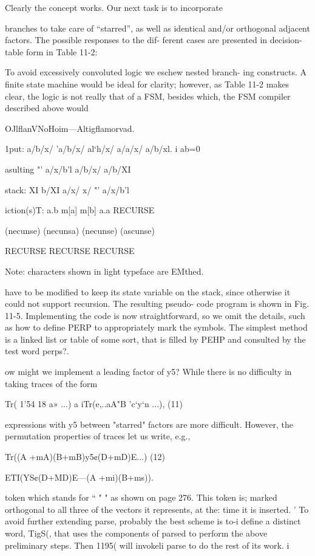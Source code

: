 Clearly the concept works. Our next task is to incorporate

branches to take care of “starred”, as well as identical and/or
orthogonal adjacent factors. The possible responses to the dif-
ferent cases are presented in decision-table form in Table 11-2:

To avoid excessively convoluted logic we eschew nested branch-
ing constructs. A finite state machine would be ideal for clarity;
however, as Table 11-2 makes clear, the logic is not really that of
a FSM, besides which, the FSM compiler described above would

OJlﬂanVNoHoim—Altigﬂamorvad.

 

 

1put: a/b/x/ 'a/b/x/ al‘h/x/ a/a/x/ a/b/xl. i
ab=0

asulting "' a/x/b'l a/b/x/ a/b/XI

stack: XI b/XI a/x/ x/ "' a/x/b’l

iction(s)T: a.b m[a] m[b] a.a RECURSE

 

(necunse) (necunsa) (necunse) (ascunse)

RECURSE RECURSE RECURSE

 

Note: characters shown in light typeface are EMthed.

 

have to be modified to keep its state variable on the stack, since
otherwise it could not support recursion. The resulting pseudo-
code program is shown in Fig. 11-5. Implementing the code is now
straightforward, so we omit the details, such as how to define
PERP to appropriately mark the symbols. The simplest method
is a linked list or table of some sort, that is filled by PEHP and
consulted by the test word perps?.

ow might we implement a leading factor of y5? While there
is no difficulty in taking traces of the form

Tr( 1'54 18 a» ...) a iTr(e,..aA"B ’c‘y‘n ...), (11)

expressions with y5 between "starred" factors are more difficult.
However, the permutation properties of traces let us write, e.g.,

Tr((A +mA)(B+mB)y5¢(D+mD)E...)
(12)

ETI(YS¢(D+MD)E---(A +mi)(B+ms)).


token which stands for “ " " as shown on page 276. This token is;
marked orthogonal to all three of the vectors it represents, at the:
time it is inserted. '
To avoid further extending parse, probably the best scheme is to-i
define a distinct word, TigS(, that uses the components of parsed
to perform the above preliminary steps. Then 1195( will invokeli
parse to do the rest of its work. i

